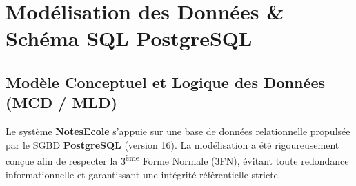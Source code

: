 \documentclass[11pt,a4paper,oneside]{report}
\begin{document}
\chapter{Modélisation des Données \& Schéma SQL PostgreSQL}
\label{chap:sql}

\section{Modèle Conceptuel et Logique des Données (MCD / MLD)}

Le système \textbf{NotesEcole} s'appuie sur une base de données relationnelle propulsée par le SGBD \textbf{PostgreSQL} (version 16). La modélisation a été rigoureusement conçue afin de respecter la 3\textsuperscript{ème} Forme Normale (3FN), évitant toute redondance informationnelle et garantissant une intégrité référentielle stricte.
\end{document}
